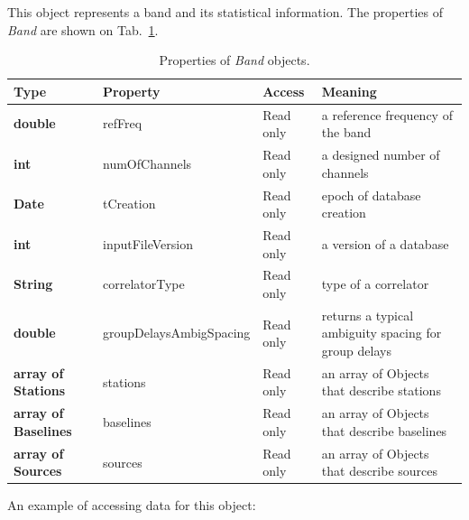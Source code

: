 \documentclass [10pt,letterpaper]{report}
\begin{document}
This object represents a band and its statistical information. The properties
of {\sl Band} are shown on Tab.~\ref{tab-scr-session-band}.

\begin{table}[htb]
\centering
\footnotesize
\begin{tabular}{lllp{}}
\hline
Type & Property & Access & Meaning\\
\hline
  {\bf double}  & refFreq          & Read only & a reference frequency of the band\\
  {\bf int}     & numOfChannels    & Read only & a designed number of channels\\
  {\bf Date}    & tCreation        & Read only & epoch of database creation\\
  {\bf int}     & inputFileVersion & Read only & a version of a database\\
  {\bf String}  & correlatorType   & Read only & type of a correlator\\
  {\bf double}  & groupDelaysAmbigSpacing
                                   & Read only & returns a typical ambiguity spacing for group delays\\
  {\bf array of Stations}          & stations  & Read only & an array of Objects that describe stations\\
  {\bf array of Baselines}         & baselines & Read only & an array of Objects that describe baselines\\
  {\bf array of Sources}           & sources   & Read only & an array of Objects that describe sources\\
\hline
\end{tabular}
\caption{Properties of {\sl Band} objects.}
\label{tab-scr-session-band}
\end{table}
\noindent
An example of accessing data for this object:
\end{document}
